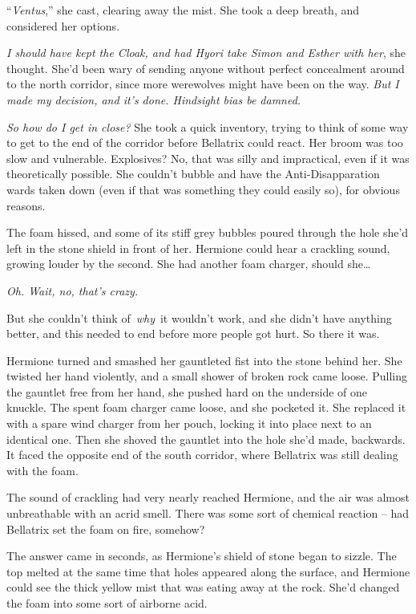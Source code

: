 ``\emph{Ventus},'' she cast, clearing away the mist. She took a deep
breath, and considered her options.

\emph{I should have kept the Cloak, and had Hyori take Simon and Esther
with her}, she thought. She'd been wary of sending anyone without
perfect concealment around to the north corridor, since more werewolves
might have been on the way. \emph{But I made my decision, and it's done.
Hindsight bias be damned.}

\emph{So how do I get in close?} She took a quick inventory, trying to
think of some way to get to the end of the corridor before Bellatrix
could react. Her broom was too slow and vulnerable. Explosives? No, that
was silly and impractical, even if it was theoretically possible. She
couldn't bubble and have the Anti-Disapparation wards taken down (even
if that was something they could easily so), for obvious reasons.

The foam hissed, and some of its stiff grey bubbles poured through the
hole she'd left in the stone shield in front of her. Hermione could hear
a crackling sound, growing louder by the second. She had another foam
charger, should she\ldots{}

\emph{Oh. Wait, no, that's crazy.}

But she couldn't think of~\emph{why}~it wouldn't work, and she didn't
have anything better, and this needed to end before more people got
hurt. So there it was.

Hermione turned and smashed her gauntleted fist into the stone behind
her. She twisted her hand violently, and a small shower of broken rock
came loose. Pulling the gauntlet free from her hand, she pushed hard on
the underside of one knuckle. The spent foam charger came loose, and she
pocketed it. She replaced it with a spare wind charger from her pouch,
locking it into place next to an identical one. Then she shoved the
gauntlet into the hole she'd made, backwards. It faced the opposite end
of the south corridor, where Bellatrix was still dealing with the foam.

The sound of crackling had very nearly reached Hermione, and the air was
almost unbreathable with an acrid smell. There was some sort of chemical
reaction -- had Bellatrix set the foam on fire, somehow?

The answer came in seconds, as Hermione's shield of stone began to
sizzle. The top melted at the same time that holes appeared along the
surface, and Hermione could see the thick yellow mist that was eating
away at the rock. She'd changed the foam into some sort of airborne
acid.


